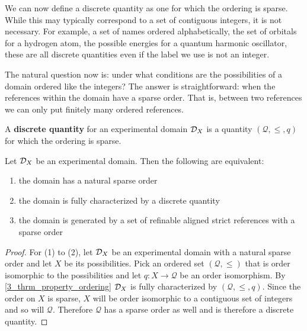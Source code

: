 \documentclass[11pt,letterpaper,fleqn]{memoir} %
\begin{document}
We can now define a discrete quantity as one for which the ordering is sparse. While this may typically correspond to a set of contiguous integers, it is not necessary. For example, a set of names ordered alphabetically, the set of orbitals for a hydrogen atom, the possible energies for a quantum harmonic oscillator, these are all discrete quantities even if the label we use is not an integer.

The natural question now is: under what conditions are the possibilities of a domain ordered like the integers? The answer is straightforward: when the references within the domain have a sparse order. That is, between two references we can only put finitely many ordered references.

\begin{mathSection}
\begin{defn}
	A \textbf{discrete quantity} for an experimental domain $\mathcal{D}_X$ is a quantity $(\mathcal{Q}, \leq, q)$ for which the ordering is sparse.
\end{defn}

\begin{thrm}
	Let $\mathcal{D}_X$ be an experimental domain. Then the following are equivalent:
	\begin{enumerate}
		\item the domain has a natural sparse order
		\item the domain is fully characterized by a discrete quantity
		\item the domain is generated by a set of refinable aligned strict references with a sparse order
	\end{enumerate}
\end{thrm}
\begin{proof}
	For (1) to (2), let $\mathcal{D}_X$ be an experimental domain with a natural sparse order and let $X$ be its possibilities. Pick an ordered set $(\mathcal{Q}, \leq)$ that is order isomorphic to the possibilities and let $q: X \to \mathcal{Q}$ be an order isomorphism. By \ref{3_thrm_property_ordering} $\mathcal{D}_X$ is fully characterized by $(\mathcal{Q}, \leq, q)$. Since the order on $X$ is sparse, $X$ will be order isomorphic to a contiguous set of integers and so will $\mathcal{Q}$. Therefore $\mathcal{Q}$ has a sparse order as well and is therefore a discrete quantity.
	

\end{proof}
\end{mathSection}
\end{document}
